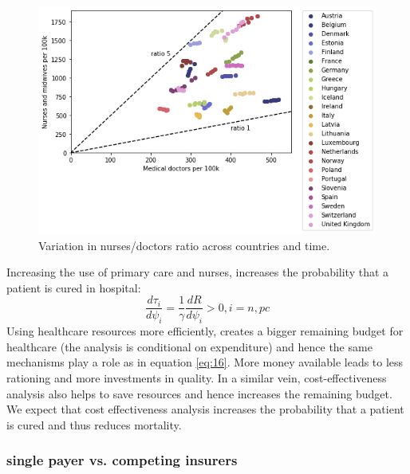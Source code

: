 \documentclass{article}
\begin{document}
\begin{figure}[htbp]
\centering
\includegraphics[width=.9\linewidth]{./figures/nurses_doctors.png}
\caption{\label{fig:org225a9c0}Variation in nurses/doctors ratio across countries and time.}
\end{figure}

Increasing the use of primary care and nurses, increases the probability that a patient is cured in hospital:
\begin{equation}
\label{eq:15}
\frac{d\tau_i}{d \psi_i} = \frac{1}{\gamma} \frac{dR}{d \psi_i} > 0, i = n, pc
\end{equation}
Using healthcare resources more efficiently, creates a bigger remaining budget for healthcare (the analysis is conditional on expenditure) and hence the same mechanisms play a role as in equation \eqref{eq:16}. More money available leads to less rationing and more investments in quality. In a similar vein, cost-effectiveness analysis also helps to save resources and hence increases the remaining budget. We expect that cost effectiveness analysis increases the probability that a patient is cured and thus reduces mortality.

\subsubsection{single payer vs. competing insurers}
\label{sec:org8b78684}
\end{document}
